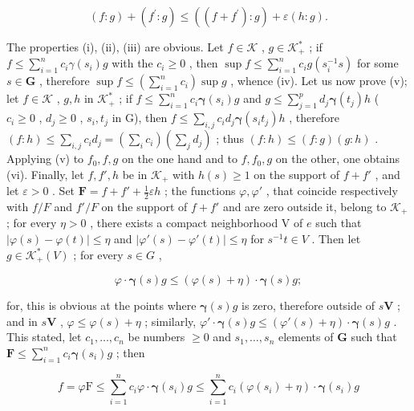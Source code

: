 \[
(f: g) + (f ^ {\prime}: g) \leqslant ((f + f ^ {\prime}): g) + \varepsilon (h: g).
\]

The properties (i), (ii), (iii) are obvious. Let \(f \in \mathcal{K}\) , \(g \in \mathcal{K}_+^*\) ; if \(f \leqslant \sum_{i=1}^{n} c_i \gamma(s_i)g\) with the \(c_i \geqslant 0\) , then \(\sup f \leqslant \sum_{i=1}^{n} c_i g(s_i^{-1}s)\) for some \(s \in \mathbf{G}\) , therefore \(\sup f \leqslant \left( \sum_{i=1}^{n} c_i \right) \sup g\) , whence (iv). Let us now prove (v); let \(f \in \mathcal{K}\) , \(g, h\) in \(\mathcal{K}_+^*\) ; if \(f \leqslant \sum_{i=1}^{n} c_i \boldsymbol{\gamma}(s_i) g\) and \(g \leqslant \sum_{j=1}^{p} d_j \boldsymbol{\gamma}(t_j) h\) ( \(c_i \geqslant 0\) , \(d_j \geqslant 0\) , \(s_i, t_j\) in G), then \(f \leqslant \sum_{i,j} c_i d_j \boldsymbol{\gamma}(s_i t_j) h\) , therefore \((f: h) \leqslant \sum_{i,j} c_i d_j = \left( \sum_{i} c_i \right) \left( \sum_{j} d_j \right)\) ; thus \((f: h) \leqslant (f: g)(g: h)\) . Applying (v) to \(f_0, f, g\) on the one hand and to \(f, f_0, g\) on the other, one obtains (vi). Finally, let \(f, f', h\) be in \(\mathcal{K}_+\) with \(h(s) \geqslant 1\) on the support of \(f + f'\) , and let \(\varepsilon > 0\) . Set \(\mathbf{F} = f + f' + \frac{1}{2} \varepsilon h\) ; the functions \(\varphi, \varphi'\) , that coincide respectively with \(f / F\) and \(f'/F\) on the support of \(f + f'\) and are zero outside it, belong to \(\mathcal{K}_+\) ; for every \(\eta > 0\) , there exists a compact neighborhood V of \(e\) such that \(|\varphi(s) - \varphi(t)| \leqslant \eta\) and \(|\varphi'(s) - \varphi'(t)| \leqslant \eta\) for \(s^{-1} t \in V\) . Then let \(g \in \mathcal{K}_+^*(V)\) ; for every \(s \in G\) ,

\[
\varphi \cdot \boldsymbol {\gamma} (s) g \leqslant (\varphi (s) + \eta) \cdot \boldsymbol {\gamma} (s) g;
\]

for, this is obvious at the points where \(\pmb{\gamma}(s)g\) is zero, therefore outside of \(s\mathbf{V}\) ; and in \(s\mathbf{V}\) , \(\varphi \leqslant \varphi(s) + \eta\) ; similarly, \(\varphi' \cdot \pmb{\gamma}(s)g \leqslant (\varphi'(s) + \eta) \cdot \pmb{\gamma}(s)g\) . This stated, let \(c_1, \ldots, c_n\) be numbers \(\geqslant 0\) and \(s_1, \ldots, s_n\) elements of \(\mathbf{G}\) such that \(\mathbf{F} \leqslant \sum_{i=1}^{n} c_i \pmb{\gamma}(s_i)g\) ; then

\[
f = \varphi \mathrm{F} \leqslant \sum_ {i = 1} ^ {n} c _ {i} \varphi \cdot \boldsymbol {\gamma} (s _ {i}) g \leqslant \sum_ {i = 1} ^ {n} c _ {i} (\varphi (s _ {i}) + \eta) \cdot \boldsymbol {\gamma} (s _ {i}) g
\]

